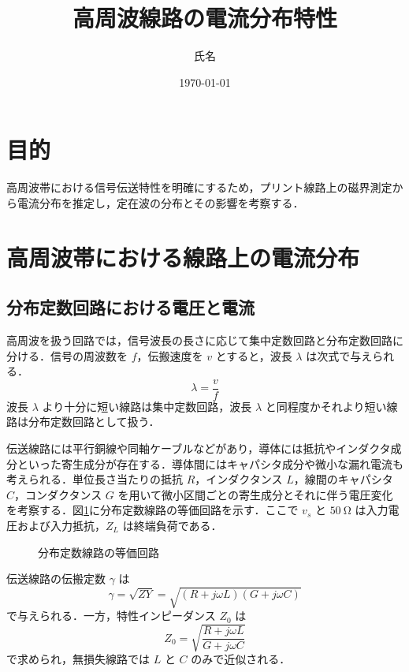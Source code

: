\documentclass[
  a4paper,  %
  11pt,     %
]{ltjsarticle}
\title{高周波線路の電流分布特性}
\author{氏名}
\date{\today}
\begin{document}
\maketitle
\tableofcontents
\clearpage

\section{目的}
高周波帯における信号伝送特性を明確にするため，プリント線路上の磁界測定から電流分布を推定し，定在波の分布とその影響を考察する．

\section{高周波帯における線路上の電流分布}

\subsection{分布定数回路における電圧と電流}
高周波を扱う回路では，信号波長の長さに応じて集中定数回路と分布定数回路に分ける．信号の周波数を $f$，伝搬速度を $v$ とすると，波長 $\lambda$ は次式で与えられる．
\begin{equation}
  \lambda = \frac{v}{f}
\end{equation}
波長 $\lambda$ より十分に短い線路は集中定数回路，波長 $\lambda$ と同程度かそれより短い線路は分布定数回路として扱う．

伝送線路には平行銅線や同軸ケーブルなどがあり，導体には抵抗やインダクタ成分といった寄生成分が存在する．導体間にはキャパシタ成分や微小な漏れ電流も考えられる．単位長さ当たりの抵抗 $R$，インダクタンス $L$，線間のキャパシタ $C$，コンダクタンス $G$ を用いて微小区間ごとの寄生成分とそれに伴う電圧変化を考察する．図\ref{fig:distributed_constant_circuit}に分布定数線路の等価回路を示す．ここで $v_s$ と $\SI{50}{\ohm}$ は入力電圧および入力抵抗，$Z_L$ は終端負荷である．

\begin{figure}[H]
  \centering
  \caption{分布定数線路の等価回路}
  \label{fig:distributed_constant_circuit}
\end{figure}

伝送線路の伝搬定数 $\gamma$ は
\begin{equation}
  \gamma = \sqrt{ZY} = \sqrt{(R+j\omega L)(G+j\omega C)}
\end{equation}
で与えられる．一方，特性インピーダンス $Z_0$ は
\begin{equation}
  Z_0 = \sqrt{\frac{R+j\omega L}{G+j\omega C}}
\end{equation}
で求められ，無損失線路では $L$ と $C$ のみで近似される．
\end{document}
